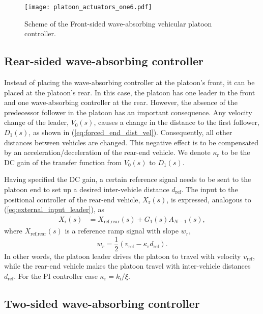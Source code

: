 \documentclass[final,5p,times,twocolumn]{elsarticle}
\begin{document}
\begin{figure*}[htb]\centering
\texttt{[image: platoon\_actuators\_one6.pdf]}
  \caption{Scheme of the Front-sided wave-absorbing vehicular platoon controller.}
  \label{fig:platoon_actuators_one}
\end{figure*}

\subsection{Rear-sided wave-absorbing controller}
\label{sec:rear_sided_WBC}

Instead of placing the wave-absorbing controller at the platoon's front, it can be placed at the platoon's rear. In this case, the platoon has one leader in the front and one wave-absorbing controller at the rear. However, the absence of the predecessor follower in the platoon has an important consequence. Any velocity change of the leader, $V_{0}(s)$, causes a change in the distance to the first follower, $D_1(s)$, as shown in (\ref{eq:forced_end_dist_vel}). Consequently, all other distances between vehicles are changed. This negative effect is to be compensated by an acceleration/deceleration of the rear-end vehicle. We denote $\kappa_{\text{r}}$ to be the DC gain of the transfer function from $V_0(s)$ to $D_1(s)$.

Having specified the DC gain, a certain reference signal needs to be sent to the platoon end to set up a desired inter-vehicle distance $d_{\text{ref}}$. The input to the positional controller of the rear-end vehicle, $X_{\text{r}}(s)$, is expressed, analogous to (\ref{eq:external_input_leader}), as
\begin{align}
X_{\text{r}}(s) &= X_{\text{ref,rear}}(s) + G_1(s)A_{N-1}(s),
\label{eq:external_input_last}
\end{align}
where $X_{\text{ref,rear}}(s)$ is a reference ramp signal with slope $w_{r}$,
\begin{equation}
w_{r} = \frac{1}{2}\left(v_{\text{ref}}-\kappa_{\text{r}} d_{\text{ref}}\right).
\label{eq:ramp_last}
\end{equation}
In other words, the platoon leader drives the platoon to travel with velocity $v_{\text{ref}}$, while the rear-end vehicle makes the platoon travel with inter-vehicle distances $d_{\text{ref}}$. For the PI controller case $\kappa_{\text{r}} = k_{\text{i}}/\xi$.

\subsection{Two-sided wave-absorbing controller}
\label{sec:two_sided_WBC}
\end{document}

